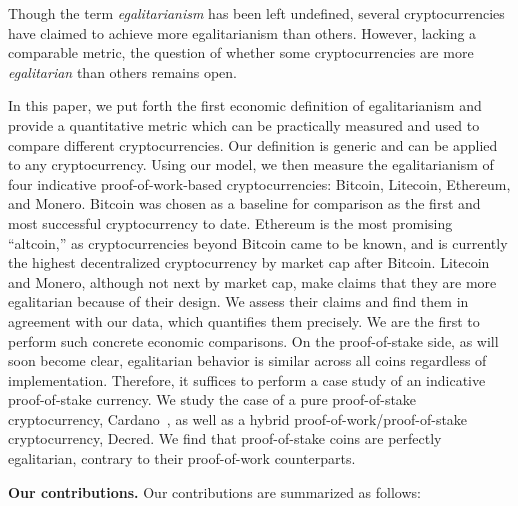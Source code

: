 
Though the term \emph{egalitarianism} has been left undefined, several
cryptocurrencies have claimed to achieve more egalitarianism than others.
However, lacking a comparable metric, the question of whether some
cryptocurrencies are more \emph{egalitarian} than others remains open.

In this paper, we put forth the first economic definition of egalitarianism
and provide a quantitative metric which can be practically measured and used
to compare different cryptocurrencies. Our definition is generic and can be
applied to any cryptocurrency.
Using our model, we then measure the egalitarianism of
four indicative proof-of-work-based
cryptocurrencies: Bitcoin, Litecoin, Ethereum, and Monero. Bitcoin was chosen as
a baseline for comparison as the first and most successful cryptocurrency to
date. Ethereum is the most promising ``altcoin,'' as cryptocurrencies beyond
Bitcoin came to be known, and is currently the highest decentralized cryptocurrency by market cap after Bitcoin. Litecoin and Monero, although not next by market cap,
make claims that they are more egalitarian because of their design.
We assess their claims and find them in agreement with our data, which quantifies them precisely.
We are the first to perform such concrete economic comparisons.
On the proof-of-stake side, as will soon become clear, egalitarian behavior is
similar across all coins regardless of implementation. Therefore, it suffices to
perform a case study of an indicative proof-of-stake currency. We study the case of a
pure proof-of-stake cryptocurrency, Cardano~\cite{C:KRDO17}, as well as a hybrid
proof-of-work/proof-of-stake cryptocurrency, Decred. We find that proof-of-stake
coins are perfectly egalitarian, contrary to their proof-of-work counterparts.


\noindent
\textbf{Our contributions.}
Our contributions are summarized as follows:

